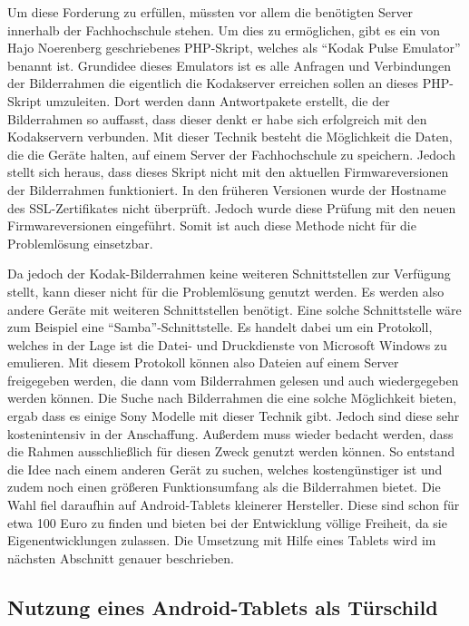 \begin{flushleft}
Um diese Forderung zu erfüllen, müssten vor allem die benötigten Server innerhalb der Fachhochschule stehen. Um dies zu ermöglichen, gibt es ein von Hajo Noerenberg geschriebenes PHP-Skript, welches als ``Kodak Pulse Emulator'' benannt ist. Grundidee dieses Emulators ist es alle Anfragen und Verbindungen der Bilderrahmen die eigentlich die Kodakserver erreichen sollen an dieses PHP-Skript umzuleiten. Dort werden dann Antwortpakete erstellt, die der Bilderrahmen so auffasst, dass dieser denkt er habe sich erfolgreich mit den Kodakservern verbunden. Mit dieser Technik besteht die Möglichkeit die Daten, die die Geräte halten, auf einem Server der Fachhochschule zu speichern. 
Jedoch stellt sich heraus, dass dieses Skript nicht mit den aktuellen Firmwareversionen der Bilderrahmen funktioniert. In den früheren Versionen wurde der Hostname des SSL-Zertifikates nicht überprüft. Jedoch wurde diese Prüfung mit den neuen Firmwareversionen eingeführt. Somit ist auch diese Methode nicht für die Problemlösung einsetzbar. 

Da jedoch der Kodak-Bilderrahmen keine weiteren Schnittstellen zur Verfügung stellt, kann dieser nicht für die Problemlösung genutzt werden. Es werden also andere Geräte mit weiteren Schnittstellen benötigt. Eine solche Schnittstelle wäre zum Beispiel eine ``Samba''-Schnittstelle. Es handelt dabei um ein Protokoll, welches in der Lage ist die Datei- und Druckdienste von Microsoft Windows zu emulieren. Mit diesem Protokoll können also Dateien auf einem Server freigegeben werden, die dann vom Bilderrahmen gelesen und auch wiedergegeben werden können. Die Suche nach Bilderrahmen die eine solche Möglichkeit bieten, ergab dass es einige Sony Modelle mit dieser Technik gibt. Jedoch sind diese sehr kostenintensiv in der Anschaffung. Außerdem muss wieder bedacht werden, dass die Rahmen ausschließlich für diesen Zweck genutzt werden können. 
So entstand die Idee nach einem anderen Gerät zu suchen, welches kostengünstiger ist und zudem noch einen größeren Funktionsumfang als die Bilderrahmen bietet. Die Wahl fiel daraufhin auf Android-Tablets kleinerer Hersteller. Diese sind schon für etwa 100 Euro zu finden und bieten bei der Entwicklung völlige Freiheit, da sie Eigenentwicklungen zulassen. 
Die Umsetzung mit Hilfe eines Tablets wird im nächsten Abschnitt genauer beschrieben. 

\subsection{Nutzung eines Android-Tablets als Türschild}

\end{flushleft}

